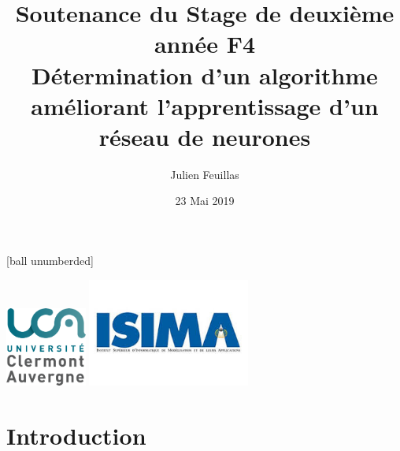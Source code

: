 \documentclass{beamer}
\title[Soutenance de Stage]{Soutenance du Stage de deuxième année F4\\Détermination d'un algorithme améliorant l'apprentissage d'un réseau de neurones}
\author{Julien Feuillas}
\institute{\bsc{ISIMA}}
\date{23 Mai 2019}
\begin{document}
[ball unumberded]

\begin{frame}
  \includegraphics[width=0.2\textwidth]{annex/logo_UCA.png}
  \hfill
  \includegraphics[width=0.4\textwidth]{annex/isima.jpeg}
  \titlepage
\end{frame}

%

%
%
%

\section*{Introduction}

\subsection*{}
\end{document}
